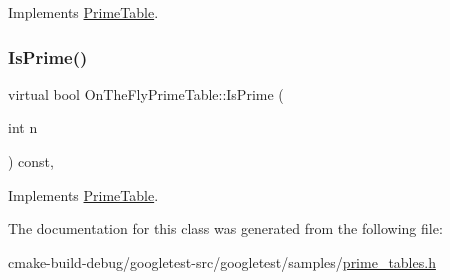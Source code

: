 Implements \mbox{\hyperlink{classPrimeTable_ae537c939f56617d8937d57bbbae3ab30}{Prime\+Table}}.

\mbox{\label{classOnTheFlyPrimeTable_a1d49b78f79e018441289e79d75680067}} 
\subsubsection{\texorpdfstring{IsPrime()}{IsPrime()}}
{\footnotesize\ttfamily virtual bool On\+The\+Fly\+Prime\+Table\+::\+Is\+Prime (\begin{DoxyParamCaption}\item[{int}]{n }\end{DoxyParamCaption}) const\hspace{0.3cm}{\ttfamily [inline]}, {\ttfamily [virtual]}}



Implements \mbox{\hyperlink{classPrimeTable_a2ab9243364ded0c51541f641b2df362a}{Prime\+Table}}.



The documentation for this class was generated from the following file\+:\begin{DoxyCompactItemize}
\item 
cmake-\/build-\/debug/googletest-\/src/googletest/samples/\mbox{\hyperlink{prime__tables_8h}{prime\+\_\+tables.\+h}}\end{DoxyCompactItemize}
